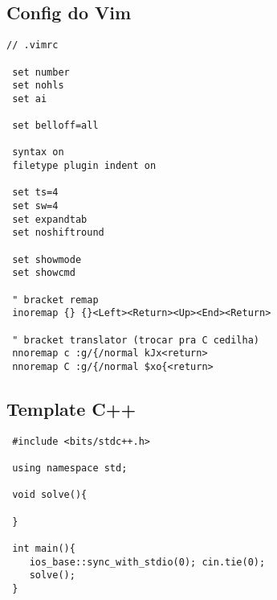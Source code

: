 \documentclass[11pt, a4paper, twoside]{article}
\begin{document}
\subsection{Config do Vim}
\begin{lstlisting}
// .vimrc

 set number
 set nohls
 set ai
 
 set belloff=all
 
 syntax on
 filetype plugin indent on
 
 set ts=4
 set sw=4
 set expandtab
 set noshiftround
 
 set showmode
 set showcmd
 
 " bracket remap
 inoremap {} {}<Left><Return><Up><End><Return> 
 
 " bracket translator (trocar pra C cedilha)
 nnoremap c :g/{/normal kJx<return>
 nnoremap C :g/{/normal $xo{<return>
\end{lstlisting}

\subsection{Template C++}
\begin{lstlisting}
 #include <bits/stdc++.h>
 
 using namespace std;
 
 void solve(){
 
 }
 
 int main(){
 	ios_base::sync_with_stdio(0); cin.tie(0);
 	solve();
 }
\end{lstlisting}
\end{document}
